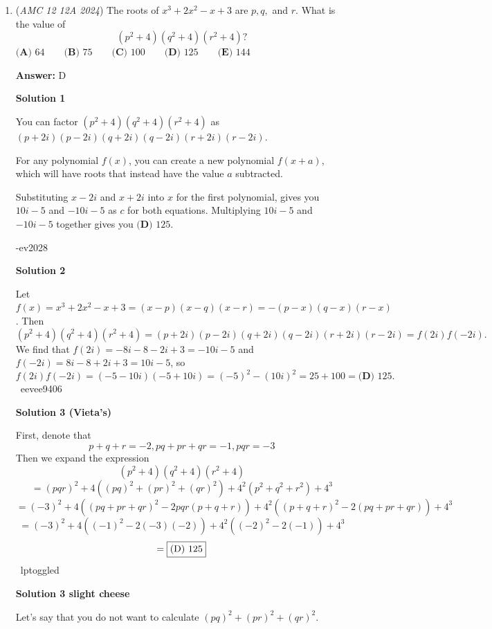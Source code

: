 \begin{enumerate}
 The digit directly below this will be $19$, as we add $x$ to $12$ or $7$. This means that to get to $(1,2)$ we must add $5$ to $24$.

 $24+5=\boxed{29}$.

 


	\item (\textit{AMC 12 12A 2024}) The roots of $x^3 + 2x^2 - x + 3$ are $p, q,$ and $r.$ What is the value of 
 \[(p^2 + 4)(q^2 + 4)(r^2 + 4)?\]
$\textbf{(A) } 64 \qquad \textbf{(B) } 75 \qquad \textbf{(C) } 100 \qquad \textbf{(D) } 125 \qquad \textbf{(E) } 144$

 \textbf{Answer: }D



\textbf{Solution 1}

You can factor $(p^2 + 4)(q^2 + 4)(r^2 + 4)$ as $(p+2i)(p-2i)(q+2i)(q-2i)(r+2i)(r-2i)$.

 For any polynomial $f(x)$, you can create a new polynomial $f(x+a)$, which will have roots that instead have the value $a$ subtracted.

 Substituting $x-2i$ and $x+2i$ into $x$ for the first polynomial, gives you $10i-5$ and $-10i-5$ as $c$ for both equations. Multiplying $10i-5$ and $-10i-5$ together gives you $\boxed{\textbf{(D) }125}$.

 -ev2028

 



\textbf{Solution 2}

Let $f(x) = x^3 + 2x^2 - x + 3 = (x - p)(x - q)(x - r) = -(p - x)(q - x)(r - x)$. Then
 \[(p^2 + 4)(q^2 + 4)(r^2 + 4)=(p+2i)(p-2i)(q+2i)(q-2i)(r+2i)(r-2i)=f(2i)f(-2i).\]We find that $f(2i)=-8i-8-2i+3=-10i-5$ and $f(-2i)=8i-8+2i+3=10i-5$, so 
 \[f(2i)f(-2i)=(-5-10i)(-5+10i)=(-5)^2-(10i)^2=25+100=\boxed{\textbf{(D) }125}.\]~eevee9406

 



\textbf{Solution 3 (Vieta’s)}

First, denote that
 \[p+q+r=-2, pq+pr+qr=-1, pqr=-3\]Then we expand the expression
 \[(p^2+4)(q^2+4)(r^2+4)\]
 \[=(pqr)^2+4((pq)^2+(pr)^2+(qr)^2)+4^2(p^2+q^2+r^2)+4^3\]
 \[=(-3)^2+4((pq+pr+qr)^2-2pqr(p+q+r))+4^2((p+q+r)^2-2(pq+pr+qr))+4^3\]
 \[=(-3)^2+4((-1)^2-2(-3)(-2))+4^2((-2)^2-2(-1))+4^3\]
 \[=\fbox{(D) 125}\]~lptoggled

 



\textbf{Solution 3 slight cheese}

Let's say that you do not want to calculate $(pq)^2+(pr)^2+(qr)^2$.


\end{enumerate}
